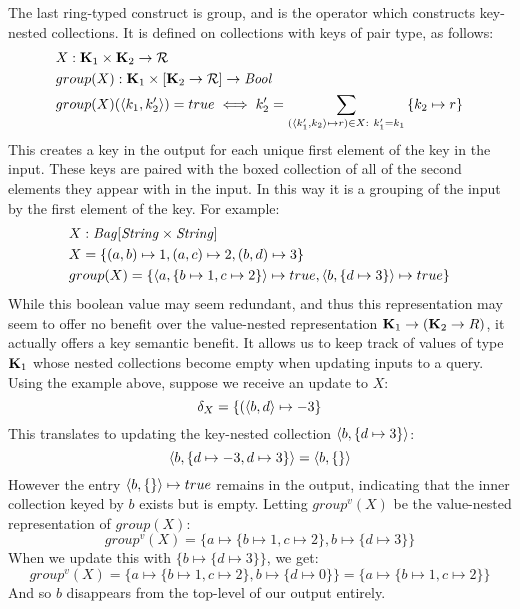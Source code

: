 {{{\vs The last ring-typed construct is group, and is the operator which constructs key-nested collections. It is defined on collections with keys of pair type, as follows:
\begin{equation*}
\begin{split}
&X: \mathbf{K}_1 \times \mathbf{K}_2 \rightarrow \mathcal{R} \\
&group(X): \mathbf{K}_1 \times [\mathbf{K}_2 \rightarrow \mathcal{R}] \rightarrow \textrm{\textit{Bool}} \\
&group(X)(\langle k_1, k_2' \rangle) = true \iff k_2' = \sum_{(\langle k_1', k_2 \rangle \mapsto r) \in X : \ k_1' = k_1} {\{k_2 \mapsto r\}} 
\end{split}
\end{equation*}
This creates a key in the output for each unique first element of the key in the input. These keys are paired with the boxed collection of all of the second elements they appear with in the input. In this way it is a grouping of the input by the first element of the key. For example:
\begin{equation*}
\begin{split}
&X: \textrm{\textit{Bag}}[\textrm{\textit{String}}\times \textrm{\textit{String}}] \\
&X = \{(a,b) \mapsto 1, (a, c) \mapsto 2, (b,d) \mapsto 3\} \\
&group(X) = \{\langle a, \{b \mapsto 1, c \mapsto 2\} \rangle \mapsto true, \langle b, \{d \mapsto 3 \} \rangle \mapsto true \}
\end{split}
\end{equation*}
While this boolean value may seem redundant, and thus this representation may seem to offer no benefit over the value-nested representation $\mathbf{K}_1 \rightarrow (\mathbf{K}_2 \rightarrow R)$, it actually offers a key semantic benefit. It allows us to keep track of values of type $\mathbf{K}_1$ whose nested collections become empty when updating inputs to a query. Using the example above, suppose we receive an update to $X$:
\begin{equation*}
\delta_X = \{(\langle b, d \rangle \mapsto -3\}
\end{equation*}
This translates to updating the key-nested collection $\langle b, \{d \mapsto 3\} \rangle$:
\begin{equation*}
 \langle b, \{d \mapsto -3, d \mapsto 3\} \rangle = \langle b, \{\} \rangle
 \end{equation*}
However the entry $\langle b, \{\} \rangle \mapsto true$ remains in the output, indicating that the inner collection keyed by $b$ exists but is empty.
Letting $group^v(X)$ be the value-nested representation of $group(X)$:
\begin{equation*}
group^v(X) = \{a \mapsto \{b \mapsto 1, c  \mapsto 2\}, b \mapsto \{d \mapsto 3\}\}
\end{equation*}
When we update this with $\{b \mapsto \{d \mapsto 3\}\}$, we get:
\begin{equation*}
group^v(X) = \{a \mapsto \{b \mapsto 1, c  \mapsto 2\}, b \mapsto \{d \mapsto 0\}\} = \{a \mapsto \{b \mapsto 1, c  \mapsto 2\}\}
\end{equation*}
And so $b$ disappears from the top-level of our output entirely. 

}}}
